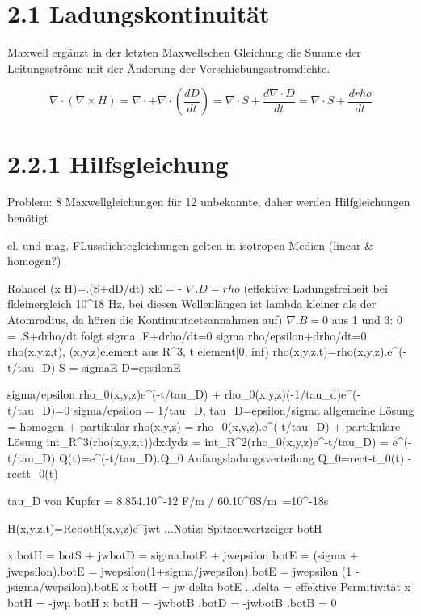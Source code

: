\documentclass[a4paper]{article}
\begin{document}
\section{2.1 Ladungskontinuität}
Maxwell ergänzt in der letzten Maxwellschen Gleichung die Summe der Leitungsströme mit der Änderung der Verschiebungsstromdichte.

\[
\nabla \cdot (\nabla \times H) = \nabla \cdot + \nabla\cdot(\frac{dD}{dt})
= \nabla\cdot S + \frac{d\nabla\cdot D}{dt}
= \nabla\cdot S + \frac{drho}{dt}
\]

\section{2.2.1 Hilfsgleichung}
Problem: 8 Maxwellgleichungen für 12 unbekannte, daher werden Hilfgleichungen benötigt

el. und mag. FLussdichtegleichungen gelten in isotropen Medien (linear & homogen?)

Rohacel
\nabla\cdot(\nabla x H)=\nabla.(S+dD/dt)
\nabla xE = -
$\nabla . D=rho$ (effektive Ladungsfreiheit bei fkleinergleich 10^18 Hz, 
bei diesen Wellenl\"angen ist lambda kleiner als der Atomradius, da hören die Kontinuutaetsannahmen auf)
$\nabla.B=0$
aus 1 und 3:
0 = \nabla.S+drho/dt folgt sigma \nabla.E+drho/dt=0
                           sigma rho/epsilon+drho/dt=0
                                rho(x,y,z,t), (x,y,z)element aus R^3, t element[0, inf)
                                rho(x,y,z,t)=rho(x,y,z).e^(-t/tau_D)
S = sigmaE
D=epsilonE

sigma/epsilon rho_0(x,y,z)e^(-t/tau_D) + rho_0(x,y,z)(-1/tau_d)e^(-t/tau_D)=0
sigma/epsilon = 1/tau_D, tau_D=epsilon/sigma
allgemeine Lösung = homogen + partikulär
rho(x,y,z) = rho_0(x,y,z).e^(-t/tau_D) + partikuläre Lösung
int_R^3(rho(x,y,z,t))dxdydz = int_R^2(rho_0(x,y,z)e^-t/tau_D)
                            = e^(-t/tau_D)
                            Q(t)=e^(-t/tau_D).Q_0
Anfangsladungsverteilung
Q_0=rect-t_0(t) - rectt_0(t)

tau_D von Kupfer = 8,854.10^-12 F/m / 60.10^6S/m~=10^-18s

H(x,y,z,t)=Re{botH(x,y,z)e^jwt} ...Notiz: Spitzenwertzeiger botH

\nabla x botH = botS + jwbotD = sigma.botE + jwepsilon botE = (sigma + jwepsilon).botE = jwepsilon(1+sigma/jwepsilon).botE = jwepsilon (1 - jsigma/wepsilon).botE
        \nabla x botH = jw delta botE   ...delta = effektive Permitivität
        \nabla x botH = -jwµ botH
\nabla x botH = -jwbotB
\nabla.botD = -jwbotB
\nabla.botB = 0
\end{document}
